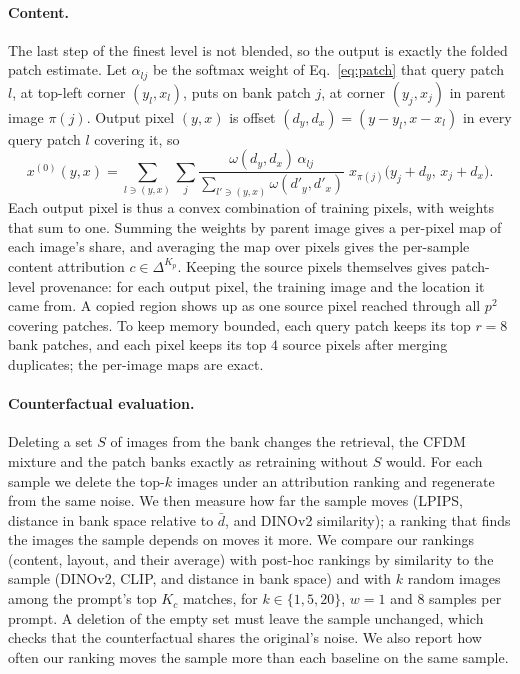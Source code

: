 \paragraph{Content.}
The last step of the finest level is not blended, so the output is exactly the folded patch estimate. Let $\alpha_{l j}$ be the softmax weight of Eq.~\eqref{eq:patch} that query patch $l$, at top-left corner $(y_l,x_l)$, puts on bank patch $j$, at corner $(y_j,x_j)$ in parent image $\pi(j)$. Output pixel $(y,x)$ is offset $(d_y,d_x)=(y-y_l,x-x_l)$ in every query patch $l$ covering it, so
\begin{equation}
  x^{(0)}(y,x) = \sum_{l \ni (y,x)} \sum_j \frac{\omega(d_y,d_x)\,\alpha_{lj}}{\sum_{l'\ni(y,x)}\omega(d'_y,d'_x)}\; x_{\pi(j)}\big(y_j+d_y,\,x_j+d_x\big).
  \label{eq:sources}
\end{equation}
Each output pixel is thus a convex combination of training pixels, with weights that sum to one. Summing the weights by parent image gives a per-pixel map of each image's share, and averaging the map over pixels gives the per-sample content attribution $c\in\Delta^{K_p}$. Keeping the source pixels themselves gives patch-level provenance: for each output pixel, the training image and the location it came from. A copied region shows up as one source pixel reached through all $p^2$ covering patches. To keep memory bounded, each query patch keeps its top $r=8$ bank patches, and each pixel keeps its top $4$ source pixels after merging duplicates; the per-image maps are exact.

\paragraph{Counterfactual evaluation.}
Deleting a set $S$ of images from the bank changes the retrieval, the CFDM mixture and the patch banks exactly as retraining without $S$ would. For each sample we delete the top-$k$ images under an attribution ranking and regenerate from the same noise. We then measure how far the sample moves (LPIPS, distance in bank space relative to $\bar d$, and DINOv2 similarity); a ranking that finds the images the sample depends on moves it more. We compare our rankings (content, layout, and their average) with post-hoc rankings by similarity to the sample (DINOv2, CLIP, and distance in bank space) and with $k$ random images among the prompt's top $K_c$ matches, for $k\in\{1,5,20\}$, $w=1$ and $8$ samples per prompt. A deletion of the empty set must leave the sample unchanged, which checks that the counterfactual shares the original's noise. We also report how often our ranking moves the sample more than each baseline on the same sample.

